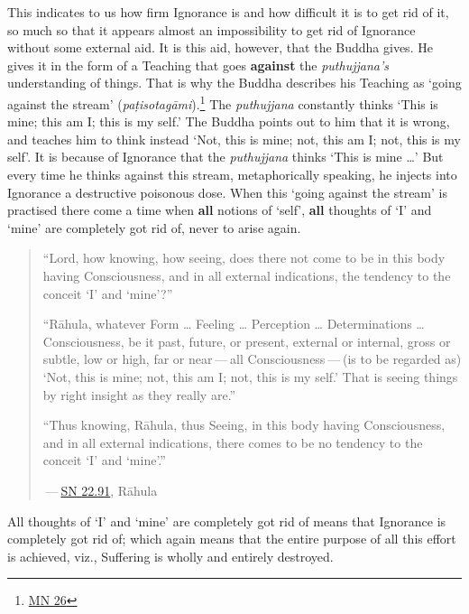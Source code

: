 This indicates to us how firm Ignorance is and how difficult it is to get rid of it, so much so that it appears almost an impossibility to get rid of Ignorance without some external aid. It is this aid, however, that the Buddha gives. He gives it in the form of a Teaching that goes \textbf{against} the \emph{puthujjana's} understanding of things. That is why the Buddha describes his Teaching as `going against the stream' (\emph{paṭisotagāmi}).\footnote{\href{https://suttacentral.net/mn26/en/bodhi}{MN 26}} The \emph{puthujjana} constantly thinks `This is mine; this am I; this is my self.' The Buddha points out to him that it is wrong, and teaches him to think instead `Not, this is mine; not, this am I; not, this is my self'. It is because of Ignorance that the \emph{puthujjana} thinks `This is mine \ldots\hspace{0pt}' But every time he thinks against this stream, metaphorically speaking, he injects into Ignorance a destructive poisonous dose. When this `going against the stream' is practised there come a time when \textbf{all} notions of `self', \textbf{all} thoughts of `I' and `mine' are completely got rid of, never to arise again.

\begin{quote}
``Lord, how knowing, how seeing, does there not come to be in this body having Consciousness, and in all external indications, the tendency to the conceit `I' and `mine'?''

``Rāhula, whatever Form \ldots\hspace{0pt} Feeling \ldots\hspace{0pt} Perception \ldots\hspace{0pt} Determinations \ldots\hspace{0pt} Consciousness, be it past, future, or present, external or internal, gross or subtle, low or high, far or near --- all Consciousness --- (is to be regarded as) `Not, this is mine; not, this am I; not, this is my self.' That is seeing things by right insight as they really are.''

``Thus knowing, Rāhula, thus Seeing, in this body having Consciousness, and in all external indications, there comes to be no tendency to the conceit `I' and `mine'.''

 --- \href{https://suttacentral.net/sn22.91/en/bodhi}{SN 22.91}, Rāhula
\end{quote}

All thoughts of `I' and `mine' are completely got rid of means that Ignorance is completely got rid of; which again means that the entire purpose of all this effort is achieved, viz., Suffering is wholly and entirely destroyed.

